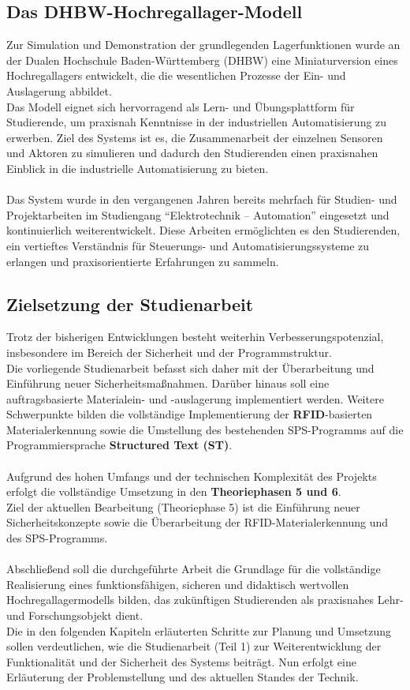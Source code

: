 \subsection{Das DHBW-Hochregallager-Modell}
Zur Simulation und Demonstration der grundlegenden Lagerfunktionen wurde an der Dualen Hochschule Baden-Württemberg (DHBW) eine Miniaturversion eines Hochregallagers entwickelt, die die wesentlichen Prozesse der Ein- und Auslagerung abbildet.\\
Das Modell eignet sich hervorragend als Lern- und Übungsplattform für Studierende, um praxisnah Kenntnisse in der industriellen Automatisierung zu erwerben. Ziel des Systems ist es, die Zusammenarbeit der einzelnen Sensoren und Aktoren zu simulieren und dadurch den Studierenden einen praxisnahen Einblick in die industrielle Automatisierung zu bieten.\\\\
Das System wurde in den vergangenen Jahren bereits mehrfach für Studien- und Projektarbeiten im Studiengang \enquote{Elektrotechnik – Automation} eingesetzt und kontinuierlich weiterentwickelt. Diese Arbeiten ermöglichten es den Studierenden, ein vertieftes Verständnis für Steuerungs- und Automatisierungssysteme zu erlangen und praxisorientierte Erfahrungen zu sammeln.
\subsection{Zielsetzung der Studienarbeit}
Trotz der bisherigen Entwicklungen besteht weiterhin Verbesserungspotenzial, insbesondere im Bereich der Sicherheit und der Programmstruktur.\\
Die vorliegende Studienarbeit befasst sich daher mit der Überarbeitung und Einführung neuer Sicherheitsmaßnahmen. Darüber hinaus soll eine auftragsbasierte Materialein- und -auslagerung implementiert werden. Weitere Schwerpunkte bilden die vollständige Implementierung der \textbf{RFID}-basierten Materialerkennung sowie die Umstellung des bestehenden SPS-Programms auf die Programmiersprache \textbf{Structured Text (ST)}.\\\\
Aufgrund des hohen Umfangs und der technischen Komplexität des Projekts erfolgt die vollständige Umsetzung in den \textbf{Theoriephasen 5 und 6}.\\
Ziel der aktuellen Bearbeitung (Theoriephase 5) ist die Einführung neuer Sicherheitskonzepte sowie die Überarbeitung der RFID-Materialerkennung und des SPS-Programms.\\\\
Abschließend soll die durchgeführte Arbeit die Grundlage für die vollständige Realisierung eines funktionsfähigen, sicheren und didaktisch wertvollen Hochregallagermodells bilden, das zukünftigen Studierenden als praxisnahes Lehr- und Forschungsobjekt dient.\\
Die in den folgenden Kapiteln erläuterten Schritte zur Planung und Umsetzung sollen verdeutlichen, wie die Studienarbeit (Teil 1) zur Weiterentwicklung der Funktionalität und der Sicherheit des Systems beiträgt. Nun erfolgt eine Erläuterung der Problemstellung und des aktuellen Standes der Technik.